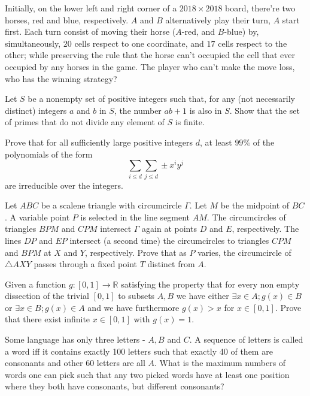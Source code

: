 \documentclass[11pt]{scrartcl}
\begin{document}
\begin{problem}[1637184643761804371]
Initially, on the lower left and right corner of a $2018\times 2018$ board, there're two horses, red and blue, respectively. $A$ and $B$ alternatively play their turn, $A$ start first. Each turn consist of moving their horse ($A$-red, and $B$-blue) by, simultaneously, $20$ cells respect to one coordinate, and $17$ cells respect to the other; while preserving the rule that the horse can't occupied the cell that ever occupied by any horses in the game. The player who can't make the move loss, who has the winning strategy?
\end{problem}
\begin{problem}[1690019174311406035]
Let $S$ be a nonempty set of positive integers such that, for any (not necessarily distinct) integers $a$ and $b$ in $S$, the number $ab+1$ is also in $S$. Show that the set of primes that do not divide any element of $S$ is finite.
\end{problem}
\begin{problem}[1696528644272897376]
Prove that for all sufficiently large positive integers $d{}$, at least $99\%$ of the polynomials of the form\[\sum_{i\leqslant d}\sum_{j\leqslant d}\pm x^iy^j\]are irreducible over the integers.
\end{problem}
\begin{problem}[1700188229005727470]
Let $ABC$ be a scalene triangle with circumcircle $\Gamma$. Let $M$ be the midpoint of $BC$. A variable point $P$ is selected in the line segment $AM$. The circumcircles of triangles $BPM$ and $CPM$ intersect $\Gamma$ again at points $D$ and $E$, respectively. The lines $DP$ and $EP$ intersect (a second time) the circumcircles to triangles $CPM$ and $BPM$ at $X$ and $Y$, respectively. Prove that as $P$ varies, the circumcircle of $\triangle AXY$ passes through a fixed point $T$ distinct from $A$.
\end{problem}
\begin{problem}[1708954658940966109]
Given a function $g:[0,1] \to \mathbb{R}$ satisfying the property that for every non empty dissection of the trivial $[0,1]$ to subsets $A,B$ we have either $\exists x \in A; g(x) \in B$ or $\exists x \in B; g(x) \in A$ and we have furthermore $g(x)>x$ for $x \in [0,1]$. Prove that there exist infinite $x \in [0,1]$ with $g(x)=1$.
\end{problem}
\begin{problem}[1736102587052874498]
Some language has only three letters - $A, B$ and $C$. A sequence of letters is called a word iff it contains exactly 100 letters such that exactly 40 of them are consonants and other 60 letters are all $A$. What is the maximum numbers of words one can pick such that any two picked words have at least one position where they both have consonants, but different consonants?
\end{problem}
\end{document}
